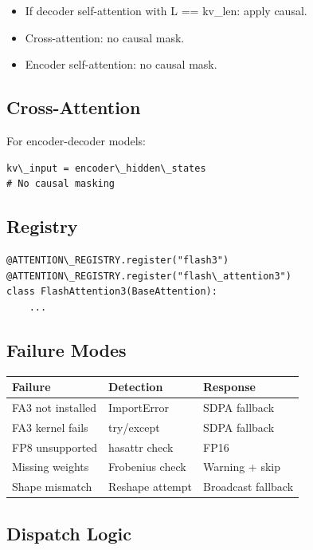 \begin{itemize}
\item If decoder self-attention with L == kv\_len: apply causal.
\item Cross-attention: no causal mask.
\item Encoder self-attention: no causal mask.

\end{itemize}
\subsection{Cross-Attention}

For encoder-decoder models:

\begin{lstlisting}
kv\_input = encoder\_hidden\_states
# No causal masking
\end{lstlisting}

\subsection{Registry}

\begin{lstlisting}
@ATTENTION\_REGISTRY.register("flash3")
@ATTENTION\_REGISTRY.register("flash\_attention3")
class FlashAttention3(BaseAttention):
    ...
\end{lstlisting}

\subsection{Failure Modes}

\begin{table}[H]
\centering
\small
\begin{tabular}{lll}
\toprule
\textbf{Failure} & \textbf{Detection} & \textbf{Response} \\
\midrule
FA3 not installed & ImportError & SDPA fallback \\
FA3 kernel fails & try/except & SDPA fallback \\
FP8 unsupported & hasattr check & FP16 \\
Missing weights & Frobenius check & Warning + skip \\
Shape mismatch & Reshape attempt & Broadcast fallback \\
\bottomrule
\end{tabular}
\end{table}

\subsection{Dispatch Logic}

